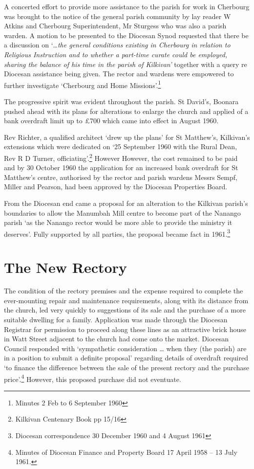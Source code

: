 A concerted effort to provide more assistance to the parish for work in
Cherbourg was brought to the notice of the general parish community by
lay reader W Atkins and Cherbourg Superintendent, Mr Sturgess who was
also a parish warden. A motion to be presented to the Diocesan Synod
requested that there be a discussion on `\ldots{}\emph{the general
conditions existing in Cherbourg in relation to Religious Instruction
and to whether a part-time curate could be employed, sharing the balance
of his time in the parish of Kilkivan'} together with a query re
Diocesan assistance being given. The rector and wardens were empowered
to further investigate `Cherbourg and Home Missions'.\footnote{Minutes 2
  Feb to 6 September 1960}

The progressive spirit was evident throughout the parish. St David's,
Boonara pushed ahead with its plans for alterations to enlarge the
church and applied of a bank overdraft limit up to \pounds700 which came into
effect in August 1960.

Rev Richter, a qualified architect `drew up the plans' for St Matthew's,
Kilkivan's extensions which were dedicated on `25 September 1960 with
the Rural Dean, Rev R D Turner, officiating'.\footnote{Kilkivan
  Centenary Book pp 15/16} However However, the cost remained to be paid
and by 30 October 1960 the application for an increased bank overdraft
for St Matthew's centre, authorised by the rector and parish wardens
Messrs Sempf, Miller and Pearson, had been approved by the Diocesan
Properties Board.

From the Diocesan end came a proposal for an alteration to the Kilkivan
parish's boundaries to allow the Manumbah Mill centre to become part of
the Nanango parish `as the Nanango rector would be more able to provide
the ministry it deserves'. Fully supported by all parties, the proposal
became fact in 1961.\footnote{Diocesan correspondence 30 December 1960
  and 4 August 1961}

\section{The New Rectory}

The condition of the rectory premises and the expense required to
complete the ever-mounting repair and maintenance requirements, along
with its distance from the church, led very quickly to suggestions of
its sale and the purchase of a more suitable dwelling for a family.
Application was made through the Diocesan Registrar for permission to
proceed along these lines as an attractive brick house in Watt Street
adjacent to the church had come onto the market. Diocesan Council
responded with `sympathetic consideration \ldots{} when they (the
parish) are in a position to submit a definite proposal' regarding
details of overdraft required `to finance the difference between the
sale of the present rectory and the purchase price'.\footnote{Minutes of
  Diocesan Finance and Property Board 17 April 1958 -- 13 July 1961.}
However, this proposed purchase did not eventuate.

